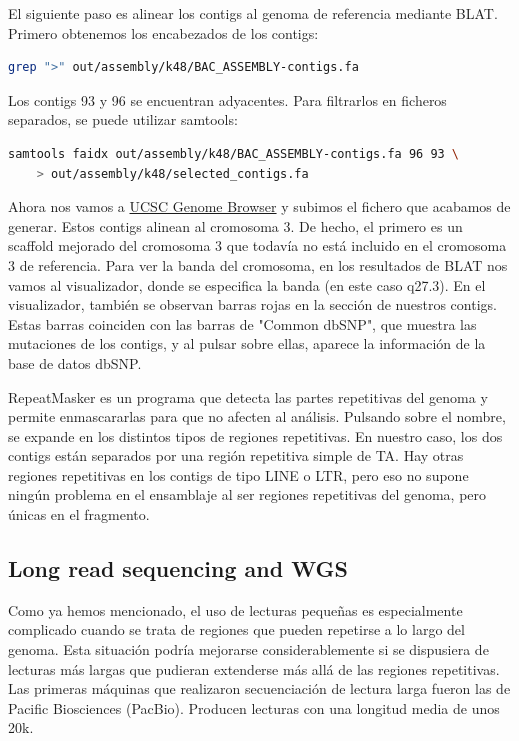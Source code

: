 El siguiente paso es alinear los contigs al genoma de referencia mediante BLAT. Primero obtenemos los encabezados de los contigs:
\begin{lstlisting}[language=bash]
grep ">" out/assembly/k48/BAC_ASSEMBLY-contigs.fa
\end{lstlisting}

Los contigs 93 y 96 se encuentran adyacentes. Para filtrarlos en ficheros separados, se puede utilizar samtools:
\begin{lstlisting}[language=bash]
samtools faidx out/assembly/k48/BAC_ASSEMBLY-contigs.fa 96 93 \
    > out/assembly/k48/selected_contigs.fa
\end{lstlisting}
Ahora nos vamos a \href{http://genome.ucsc.edu}{UCSC Genome Browser} y subimos el fichero que acabamos de generar. Estos contigs alinean al cromosoma 3. De hecho, el primero es un scaffold mejorado del cromosoma 3 que todavía no está incluido en el cromosoma 3 de referencia. Para ver la banda del cromosoma, en los resultados de BLAT nos vamos al visualizador, donde se especifica la banda (en este caso q27.3). En el visualizador, también se observan barras rojas en la sección de nuestros contigs. Estas barras coinciden con las barras de "Common dbSNP", que muestra las mutaciones de los contigs, y al pulsar sobre ellas, aparece la información de la base de datos dbSNP.

RepeatMasker es un programa que detecta las partes repetitivas del genoma y permite enmascararlas para que no afecten al análisis. Pulsando sobre el nombre, se expande en los distintos tipos de regiones repetitivas. En nuestro caso, los dos contigs están separados por una región repetitiva simple de TA. Hay otras regiones repetitivas en los contigs de tipo LINE o LTR, pero eso no supone ningún problema en el ensamblaje al ser regiones repetitivas del genoma, pero únicas en el fragmento. 

\subsection{Long read sequencing and WGS}
Como ya hemos mencionado, el uso de lecturas pequeñas es especialmente complicado cuando se trata de regiones que pueden repetirse a lo largo del genoma. Esta situación podría mejorarse considerablemente si se dispusiera de lecturas más largas que pudieran extenderse más allá de las regiones repetitivas. Las primeras máquinas que realizaron secuenciación de lectura larga fueron las de Pacific Biosciences (PacBio). Producen lecturas con una longitud media de unos 20k.

